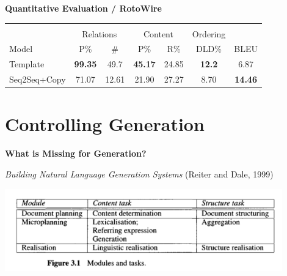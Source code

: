 \documentclass[aspectratio=169]{beamer}
\begin{document}
\begin{frame}
  \centerline{\textbf{Quantitative Evaluation / RotoWire}}
  \begin{table}
    \small
    \centering
    \begin{tabular}{lcccccc}
      \toprule
       & \multicolumn{5}{c}{} \\
       & \multicolumn{2}{c}{Relations}  & \multicolumn{2}{c}{Content} & Ordering \\
      Model & P\% & \# & P\% & R\% & DLD\%  & BLEU\\
      \midrule
      Template                 & \textbf{99.35} & 49.7  & \textbf{45.17} & 24.85 & \textbf{12.2} & 6.87    \\
      \midrule
      Seq2Seq+Copy        &   71.07 & 12.61 & 21.90 & 27.27 & 8.70 & \textbf{14.46}\\
      \bottomrule
    \end{tabular}
  \end{table}
\end{frame}




\section{Controlling Generation}

\begin{frame}
  \begin{center}
    \textbf{ What is Missing for  Generation? }
  \end{center}

    \textit{Building Natural Language Generation Systems} (Reiter and Dale, 1999)

 \begin{center}
    \includegraphics[width =12cm]{datadoc}
  \end{center}

\end{frame}
\end{document}
